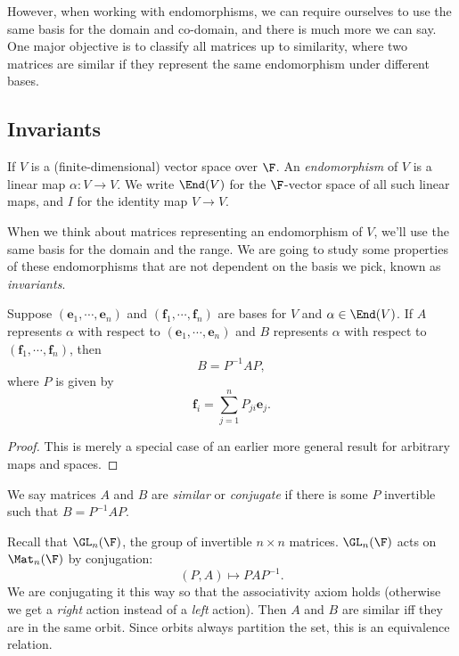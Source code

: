 \documentclass[a4paper]{article}
\begin{document}
However, when working with endomorphisms, we can require ourselves to use the same basis for the domain and co-domain, and there is much more we can say. One major objective is to classify all matrices up to similarity, where two matrices are similar if they represent the same endomorphism under different bases.

\subsection{Invariants}
\begin{defi}
  If $V$ is a (finite-dimensional) vector space over $\F$. An \emph{endomorphism} of $V$ is a linear map $\alpha: V \to V$. We write $\End(V)$ for the $\F$-vector space of all such linear maps, and $I$ for the identity map $V \to V$.
\end{defi}
When we think about matrices representing an endomorphism of $V$, we'll use the same basis for the domain and the range. We are going to study some properties of these endomorphisms that are not dependent on the basis we pick, known as \emph{invariants}.

\begin{lemma}
  Suppose $(\mathbf{e}_1, \cdots, \mathbf{e}_n)$ and $(\mathbf{f}_1, \cdots, \mathbf{f}_n)$ are bases for $V$ and $\alpha \in \End(V)$. If $A$ represents $\alpha$ with respect to $(\mathbf{e}_1, \cdots, \mathbf{e}_n)$ and $B$ represents $\alpha$ with respect to $(\mathbf{f}_1,\cdots, \mathbf{f}_n)$, then
  \[
    B = P^{-1}AP,
  \]
  where $P$ is given by
  \[
    \mathbf{f}_i = \sum_{j = 1}^n P_{ji}\mathbf{e}_j.
  \]
\end{lemma}

\begin{proof}
  This is merely a special case of an earlier more general result for arbitrary maps and spaces.
\end{proof}

\begin{defi}
  We say matrices $A$ and $B$ are \emph{similar} or \emph{conjugate} if there is some $P$ invertible such that $B = P^{-1}AP$.
\end{defi}

Recall that $\GL_n(\F)$, the group of invertible $n\times n$ matrices. $\GL_n(\F)$ acts on $\Mat_n(\F)$ by conjugation:
\[
  (P, A) \mapsto PAP^{-1}.
\]
We are conjugating it this way so that the associativity axiom holds (otherwise we get a \emph{right} action instead of a \emph{left} action). Then $A$ and $B$ are similar iff they are in the same orbit. Since orbits always partition the set, this is an equivalence relation.
\end{document}
